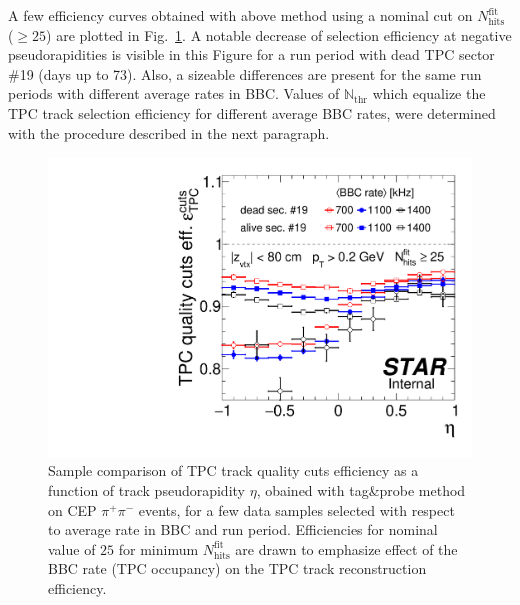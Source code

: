 A few efficiency curves obtained with above method using a nominal cut on $N_{\text{hits}}^{\text{fit}}$ ($\geq25$) are plotted in Fig.~\ref{fig:TpcEffTagAndProbe}. A notable decrease of selection efficiency at negative pseudorapidities is visible in this Figure for a run period with dead TPC sector \#19 (days up to 73). Also, a sizeable differences are present for the same run periods with different average rates in BBC. Values of $\mathbb{N}_{\text{thr}}$ which equalize the TPC track selection efficiency for different  average BBC rates, were determined with the procedure described in the next paragraph.

\begin{figure}[b!]%
\centering%
\begin{minipage}{.4725\textwidth}%
  \centering%
  \includegraphics[width=\linewidth,page=1]{graphics/systematicsEfficiency/bbc_and/TpcEffTagAndProbe.pdf}%
  \caption[Sample comparison of TPC track quality cuts efficiency from tag\&probe method.]%
  {Sample comparison of TPC track quality cuts efficiency as a function of track pseudorapidity $\eta$, obained with tag\&probe method on CEP $\pi^{+}\pi^{-}$ events, for a few data samples selected with respect to average rate in BBC and run period. Efficiencies for nominal value of $25$ for minimum $N_{\text{hits}}^{\text{fit}}$ are drawn to emphasize effect of the BBC rate (TPC occupancy) on the TPC track reconstruction efficiency.}\label{fig:TpcEffTagAndProbe}%
\end{minipage}%

\end{figure}
